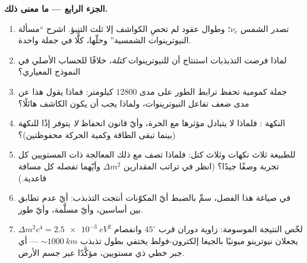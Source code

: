 \begin{problem}
\medskip\noindent\textbf{الجزء الرابع --- ما معنى ذلك.}
\begin{enumerate}[resume]
  \item تصدر الشمس $\nu_e$؛ وطوال عقود لم تحصِ الكواشف إلا
        ثلث التنبؤ. اشرح ``مسألة النيوترينوات الشمسية''
        وحلّها، كلًّا في جملة واحدة.
  \item لماذا فرضت التذبذبات استنتاج أن للنيوترينوات
        \emph{كتلة}، خلافًا للحساب الأصلي في النموذج المعياري؟
  \item جملة كمومية تحفظ ترابط الطور على مدى
        $12800$ كيلومتر: فماذا يقول هذا عن مدى ضعف تفاعل
        النيوترينوات، ولماذا يجب أن يكون الكاشف هائلًا؟
  \item النكهة : فلماذا لا يتبادل مؤثرها مع
         الحرة، وأيّ قانون انحفاظ \emph{لا}
        يتوفر إذًا للنكهة (بينما تبقى الطاقة وكمية الحركة
        محفوظتين)؟
  \item للطبيعة ثلاث نكهات وثلاث كتل: فلماذا تصف مع ذلك
        المعالجة ذات المستويين كل تجربة وصفًا
        جيدًا؟ (انظر في تراتب المقدارين $\Delta m^2$
        وأيّهما تفصله كل مسافة قاعدية.)
  \item في صياغة هذا الفصل، سمِّ بالضبط أيّ المكوّنات
        أنتجت التذبذب: أيّ عدم تطابق بين أساسين،
        وأيّ مسلَّمة، وأيّ طور.
  \item لخّص النتيجة الموسومة: زاوية دوران قرب
        $45^\circ$ وانفصام $\Delta m^2c^4 =
        \qty{2.5e-3}{eV^2}$ يجعلان نيوترينو ميونيًا بالجيغا إلكترون-فولط يختفي بطول
        تذبذب $\sim\qty{1000}{km}$ --- أي جبر خطي ذي مستويين،
        مؤكَّدًا عبر جسم الأرض.
\end{enumerate}
\end{problem}
